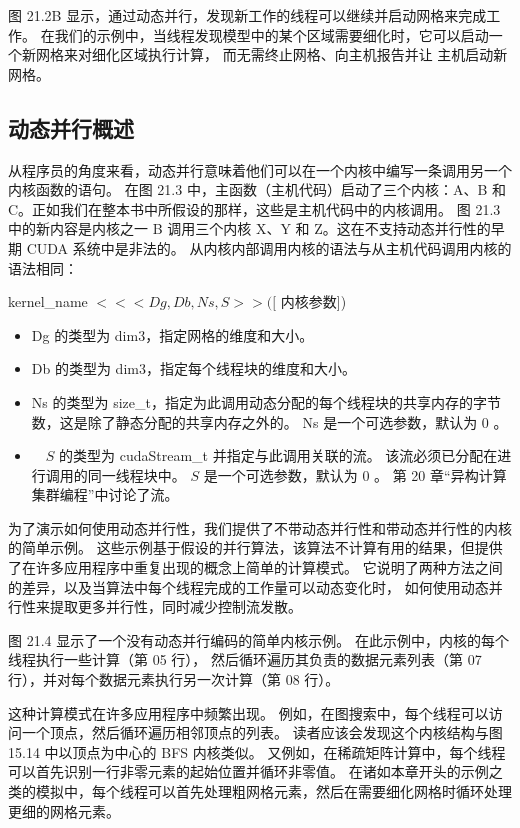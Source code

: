 图 21.2B 显示，通过动态并行，发现新工作的线程可以继续并启动网格来完成工作。 
在我们的示例中，当线程发现模型中的某个区域需要细化时，它可以启动一个新网格来对细化区域执行计算，
而无需终止网格、向主机报告并让 主机启动新网格。

\subsection{动态并行概述}
从程序员的角度来看，动态并行意味着他们可以在一个内核中编写一条调用另一个内核函数的语句。 
在图 21.3 中，主函数（主机代码）启动了三个内核：A、B 和 C。正如我们在整本书中所假设的那样，这些是主机代码中的内核调用。 
图 21.3 中的新内容是内核之一 B 调用三个内核 X、Y 和 Z。这在不支持动态并行性的早期 CUDA 系统中是非法的。 
从内核内部调用内核的语法与从主机代码调用内核的语法相同：

kernel\_name $<<<D g, D b, N s, S>>([$ 内核参数])

\begin{itemize}
   \item Dg 的类型为 dim3，指定网格的维度和大小。

   \item Db 的类型为 dim3，指定每个线程块的维度和大小。

   \item Ns 的类型为 size\_t，指定为此调用动态分配的每个线程块的共享内存的字节数，这是除了静态分配的共享内存之外的。 
   		Ns 是一个可选参数，默认为 0 。

   \item $\quad S$ 的类型为 cudaStream\_t 并指定与此调用关联的流。 该流必须已分配在进行调用的同一线程块中。 
   		$S$ 是一个可选参数，默认为 0 。 第 20 章“异构计算集群编程”中讨论了流。
\end{itemize}

为了演示如何使用动态并行性，我们提供了不带动态并行性和带动态并行性的内核的简单示例。 
这些示例基于假设的并行算法，该算法不计算有用的结果，但提供了在许多应用程序中重复出现的概念上简单的计算模式。 
它说明了两种方法之间的差异，以及当算法中每个线程完成的工作量可以动态变化时，
如何使用动态并行性来提取更多并行性，同时减少控制流发散。

图 21.4 显示了一个没有动态并行编码的简单内核示例。 在此示例中，内核的每个线程执行一些计算（第 05 行），
然后循环遍历其负责的数据元素列表（第 07 行），并对每个数据元素执行另一次计算（第 08 行）。

这种计算模式在许多应用程序中频繁出现。 例如，在图搜索中，每个线程可以访问一个顶点，然后循环遍历相邻顶点的列表。 
读者应该会发现这个内核结构与图 15.14 中以顶点为中心的 BFS 内核类似。 
又例如，在稀疏矩阵计算中，每个线程可以首先识别一行非零元素的起始位置并循环非零值。 
在诸如本章开头的示例之类的模拟中，每个线程可以首先处理粗网格元素，然后在需要细化网格时循环处理更细的网格元素。

